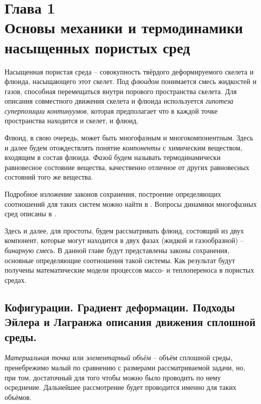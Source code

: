 \section*{Глава 1\\Основы механики и термодинамики насыщенных пористых сред}
\setcounter{section}{1}
\setcounter{subsection}{0}
\setcounter{equation}{0}

	Насыщенная пористая среда -- совокупность твёрдого деформируемого скелета и флюида, насыщающего этот скелет.
	Под \textit{флюидом} понимается смесь жидкостей и газов, способная перемещаться внутри порового пространства скелета.
	Для описания совместного движения скелета и флюида используется \textit{гипотеза суперпозиции континуумов}, которая предполагает что в каждой точке пространства находится и скелет, и флюид. 

	Флюид, в свою очередь, может быть многофазным и многокомпонентным. Здесь и далее будем отождествлять понятие \textit{компоненты} с химическим веществом, входящим в состав флюида. \textit{Фазой} будем называть термодинамически равновесное состояние вещества, качественно отличное от других равновесных состояний того же вещества. 

	Подробное изложение законов сохранения, построение определяющих соотношений для таких систем можно найти в \cite{basniev, fortov, kondaurov, checkalyuk}. Вопросы динамики многофазных сред описаны в \cite{nigmatulin}.
	
	Здесь и далее, для простоты, будем рассматривать флюид, состоящий из двух компонент, которые могут находится в двух фазах (жидкой и газообразной) -- \textit{бинарную смесь}.
	В данной главе будут представлены законы сохранения, основные определяющие соотношения такой системы. Как результат будут получены математические модели 	процессов массо- и теплопереноса в пористых средах.

\subsection{Кофигурации. Градиент деформации. Подходы Эйлера и Лагранжа описания движения сплошной среды.}
	\textit{Материальная точка} или \textit{элементарный объём} -- объём сплошной среды, пренебрежимо малый по сравнению с размерами рассматриваемой задачи, но, при том,   достаточный для того чтобы можно было проводить по нему осреднение. Дальнейшее рассмотрение будет проводится именно для таких объёмов.
	
